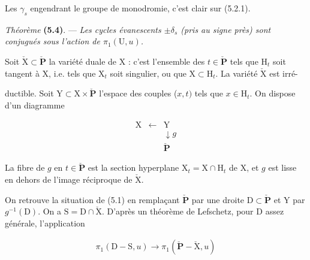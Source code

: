 \documentclass[10pt,leqno]{article}
\begin{document}
\noindent Les \(\gamma _{s}\) engendrant le groupe de monodromie, c’est clair sur (5.2.1).\par

\noindent \emph{Théorème} \textbf{(5.4)}. — {\itshape Les cycles évanescents \(\pm \delta _{s}\) (pris au signe près) sont conjugués sous l’action de \(\pi _{1}(\mathrm{U},u)\).}\par

\noindent Soit \(\check{\mathrm{X}}\subset \check{\mathbf{P}}\) la variété duale de \(\mathrm{X}\) : c’est l’ensemble des \(t\in \check{\mathbf{P}}\) tels que \(\mathrm{H}_{t}\) soit tangent à \(\mathrm{X}\), i.e. tels que \(\mathrm{X}_{t}\) soit singulier, ou que \(\mathrm{X}\subset \mathrm{H}_{t}\). La variété \(\check{\mathrm{X}}\) est irré-\par

\clearpage

\label{physical-20}\par\smallskip

\noindent ductible. Soit \(\mathrm{Y}\subset \mathrm{X}\times \check{\mathbf{P}}\) l’espace des couples (\(x,t)\) tels que \(x\in \mathrm{H}_{t}\). On dispose d’un diagramme\par

\[\begin{array}{ccc}\mathrm X&\xleftarrow{}&\mathrm Y\\ &&\downarrow\!{g}\\ &&\check{\mathbf P}\end{array}\]

\noindent La fibre de \(g\) en \(t\in \check{\mathbf{P}}\) est la section hyperplane \(\mathrm{X}_{t}=\mathrm{X}\cap \mathrm{H}_{t}\) de \(\mathrm{X}\), et \(g\) est lisse en dehors de l’image réciproque de \(\check{\mathrm{X}}\).\par

\noindent On retrouve la situation de (5.1) en remplaçant \(\check{\mathbf{P}}\) par une droite \(\mathrm{D}\subset \check{\mathbf{P}}\) et \(\mathrm{Y}\) par \(g^{- 1}(\mathrm{D})\). On a \(\mathrm{S}=\mathrm{D}\cap \check{\mathrm{X}}\). D’après un théorème de Lefschetz, pour \(\mathrm{D}\) assez générale, l’application\par

\begin{equation*}\begin{gathered}\pi _{1}(\mathrm{D}- \mathrm{S},u) \longrightarrow  \pi _{1}(\check{\mathbf{P}}- \check{\mathrm{X}},u)\end{gathered}\end{equation*}
\end{document}
